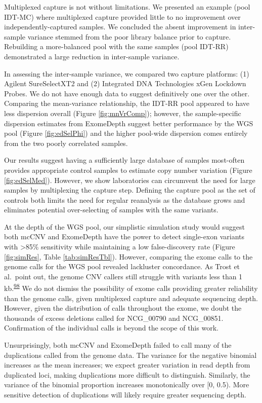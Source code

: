 \documentclass[11pt,letterpaper,oneside]{book}
\begin{document}
Multiplexed capture is not without limitations.
We presented an example (pool IDT-MC) where multiplexed capture provided little to no improvement over independently-captured samples.
We concluded the absent improvement in inter-sample variance stemmed from the poor library balance prior to capture.
Rebuilding a more-balanced pool with the same samples (pool IDT-RR) demonstrated a large reduction in inter-sample variance.

In assessing the inter-sample variance, we compared two capture platforms: (1) Agilent SureSelectXT2 and (2) Integrated DNA Technologies xGen Lockdown Probes.
We do not have enough data to suggest definitively one over the other.
Comparing the mean-variance relationship, the IDT-RR pool appeared to have less dispersion overall (Figure \ref{fig:mnVrComp}); however, the sample-specific dispersion estimates from ExomeDepth suggest better performance by the WGS pool (Figure \ref{fig:edSelPhi}) and the higher pool-wide dispersion comes entirely from the two poorly correlated samples.

Our results suggest having a sufficiently large database of samples most-often provides appropriate control samples to estimate copy number variation (Figure \ref{fig:edSelMed}).
However, we show laboratories can circumvent the need for large samples by multiplexing the capture step.
Defining the capture pool as the set of controls both limits the need for regular reanalysis as the database grows and eliminates potential over-selecting of samples with the same variants.

At the depth of the WGS pool, our simplistic simulation study would suggest both mcCNV and ExomeDepth have the power to detect single-exon variants with \textgreater85\% sensitivity while maintaining a low false-discovery rate (Figure \ref{fig:simRes}, Table \ref{tab:simResTbl}).
However, comparing the exome calls to the genome calls for the WGS pool revealed lackluster concordance.
As Trost et al.~point out, the genome CNV callers still struggle with variants less than 1 kb.\textsuperscript{\protect\hyperlink{ref-trost:2018aa}{98}}
We do not dismiss the possibility of exome calls providing greater reliability than the genome calls, given multiplexed capture and adequate sequencing depth.
However, given the distribution of calls throughout the exome, we doubt the thousands of excess deletions called for NCG\_00790 and NCG\_00851.
Confirmation of the individual calls is beyond the scope of this work.

Unsurprisingly, both mcCNV and ExomeDepth failed to call many of the duplications called from the genome data.
The variance for the negative binomial increases as the mean increases; we expect greater variation in read depth from duplicated loci, making duplications more difficult to distinguish.
Similarly, the variance of the binomial proportion increases monotonically over {[}0, 0.5).
More sensitive detection of duplications will likely require greater sequencing depth.
\end{document}
